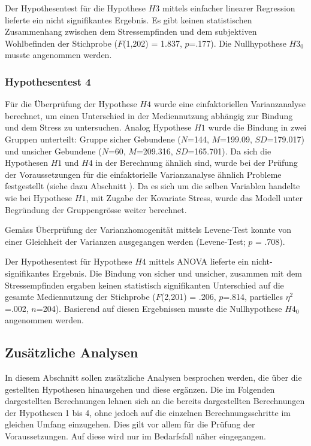 Der Hypothesentest für die Hypothese $H3$ mittels einfacher linearer Regression lieferte ein nicht signifikantes Ergebnis. Es gibt keinen statistischen Zusammenhang zwischen dem Stressempfinden und dem subjektiven Wohlbefinden der Stichprobe ($F$(1,202) = 1.837, $p$=.177).  Die Nullhypothese $H3_{0}$ musste angenommen werden.

\subsubsection{Hypothesentest 4}
Für die Überprüfung der Hypothese $H4$ wurde eine einfaktoriellen Varianzanalyse berechnet, um einen Unterschied in der Mediennutzung abhängig zur Bindung und dem Stress zu untersuchen. Analog Hypothese $H1$ wurde die Bindung in zwei Gruppen unterteilt: Gruppe sicher Gebundene ($N$=144, $M$=199.09, $SD$=179.017) und unsicher Gebundene ($N$=60, $M$=209.316, $SD$=165.701). Da sich die Hypothesen $H1$ und $H4$ in der Berechnung ähnlich sind, wurde bei der Prüfung der Voraussetzungen für die einfaktorielle Varianzanalyse ähnlich Probleme festgestellt (siehe dazu Abschnitt ). Da es sich um die selben Variablen handelte wie bei Hypothese $H1$, mit Zugabe der Kovariate Stress, wurde das Modell unter Begründung der Gruppengrösse weiter berechnet. 

Gemäss Überprüfung der Varianzhomogenität mittels Levene-Test konnte von einer Gleichheit der Varianzen ausgegangen werden (Levene-Test; $p$ = .708). 

Der Hypothesentest für Hypothese $H4$ mittels ANOVA lieferte ein nicht-signifikantes Ergebnis. Die Bindung von sicher und unsicher, zusammen mit dem Stressempfinden ergaben keinen statistisch signifikanten Unterschied auf die gesamte Mediennutzung der Stichprobe ($F$(2,201) = .206, $p$=.814, partielles $\eta^2$=.002, $n$=204). Basierend auf diesen Ergebnissen musste die Nullhypothese $H4_{0}$ angenommen werden. 

\subsection{Zusätzliche Analysen} \label{sec:ZusätzlicheAnalysen}
In diesem Abschnitt sollen zusätzliche Analysen besprochen werden, die über die gestellten Hypothesen hinausgehen und diese ergänzen. Die im Folgenden dargestellten Berechnungen lehnen sich an die bereits dargestellten Berechnungen der Hypothesen 1 bis 4, ohne jedoch auf die einzelnen Berechnungsschritte im gleichen Umfang einzugehen. Dies gilt vor allem für die Prüfung der Voraussetzungen. Auf diese wird nur im Bedarfsfall näher eingegangen.


